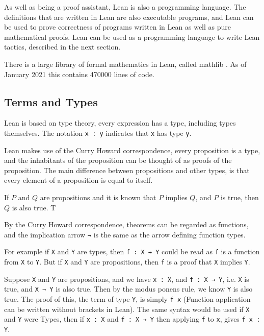 \documentclass[12pt]{article} %
\theoremstyle{definition}
\theoremstyle{definition}
\theoremstyle{definition}
\theoremstyle{definition}
\theoremstyle{definition}
\theoremstyle{definition}
\begin{document}
As well as being a proof assistant, Lean is also a programming language. The definitions
that are written in Lean are also executable programs, and Lean can be used to prove correctness
of programs written in Lean as well as pure mathematical proofs. Lean can
be used as a programming language to write Lean tactics, described in the next section.

There is a large library of formal mathematics in Lean, called mathlib
\cite{ThemathlibCommunity2020}. As of January 2021 this contains 470000 lines of code.

\subsection{Terms and Types}

Lean is based on type theory, every expression has a type,
including types themselves.
The notation \lstinline{x : y} indicates that
\lstinline{x} has type \lstinline{y}.

Lean makes use of the Curry Howard correspondence, every proposition is a type,
and the inhabitants of the proposition can be thought of as proofs of the proposition.
The main difference between propositions and other types, is that every element
of a proposition is equal to itself.

If $P$ and $Q$ are propositions and it is known that $P$ implies $Q$, and
$P$ is true, then $Q$ is also true. T

By the Curry Howard correspondence, theorems can be regarded as functions, and the
implication arrow \lstinline{→} is the same as the arrow defining function types.

For example if \lstinline{X} and \lstinline{Y} are types, then
\lstinline{f : X → Y} could be read as \lstinline{f} is a function from
\lstinline{X} to \lstinline{Y}. But if \lstinline{X} and \lstinline{Y} are propositions,
then \lstinline{f} is a proof that \lstinline{X} implies \lstinline{Y}.

Suppose \lstinline{X} and \lstinline{Y} are propositions, and we have \lstinline{x : X},
and \lstinline{f : X → Y}, i.e. \lstinline{X} is true,
and \lstinline{X → Y} is also true. Then by the modus ponens rule, we know \lstinline{Y}
is also true. The proof of this, the term of type \lstinline{Y}, is simply \lstinline{f x}
(Function application can be written without brackets in Lean).
The same syntax would be used if \lstinline{X} and \lstinline{Y} were Types,
then if \lstinline{x : X} and \lstinline{f : X → Y} then applying \lstinline{f}
to \lstinline{x}, gives \lstinline{f x : Y}.
\end{document}
